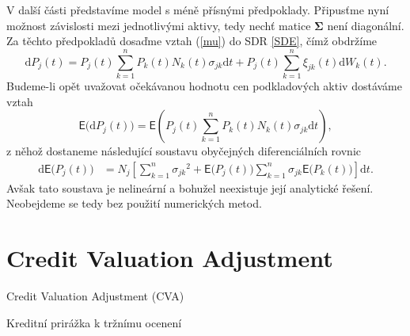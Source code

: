 \documentclass[a4paper,12pt]{report}
\theoremstyle{definition} \newtheorem{definice}[veta]{Definice}
\theoremstyle{remark}
\begin{document}
V další části představíme model s méně přísnými předpoklady.
Připusťme nyní možnost závislosti mezi jednotlivými aktivy, tedy nechť matice $\boldsymbol{\Sigma}$ není diagonální.
Za těchto předpokladů dosaďme vztah (\ref{mu}) do SDR \eqref{SDE}, čímž obdržíme
\begin{equation*} 
 \mathrm{d}P_j(t)=P_j(t)\sum_{k=1}^{n}P_k(t)N_k(t)\sigma_{jk}\mathrm{d}t+P_j(t)\sum_{k=1}^{n}\xi_{jk}(t)\mathrm{d}W_k(t).
\end{equation*}
Budeme-li opět uvažovat očekávanou hodnotu  cen podkladových aktiv do\-stá\-váme vztah
\begin{equation*} 
\mathsf{E}\big( \mathrm{d}P_j(t)\big)=\mathsf{E}\left(P_j(t)\sum_{k=1}^{n}P_k(t)N_k(t)\sigma_{jk}\mathrm{d}t\right),
\end{equation*}
z něhož dostaneme následující soustavu obyčejných diferenciálních rovnic
\begin{align*}
\mathrm{d}\mathsf{E}\big(P_j(t)\big)&=N_j\left[\sum_{k=1}^{n}{\sigma_{jk}}^2+\mathsf{E}\big(P_j(t)\big)\sum_{k=1}^{n}\sigma_{jk}\mathsf{E}\big(P_k(t)\big)\right]\mathrm{d}t.
\end{align*}  
Avšak tato soustava je nelineární a bohužel neexistuje její analytické řešení.
Neobejdeme se tedy bez použití numerických metod.



\chapter{Credit Valuation Adjustment}

Credit Valuation Adjustment (CVA)

Kreditní prirážka k tržnímu ocenení





\nocite{}  %

%


\end{document}

